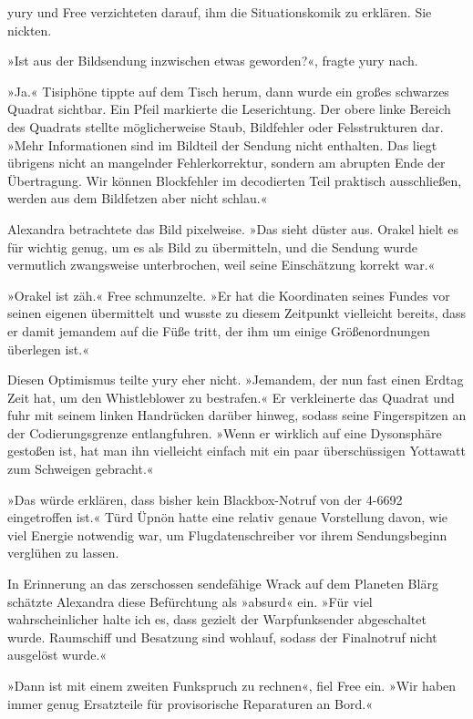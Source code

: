 yury und Free verzichteten darauf, ihm die Situationskomik zu erklären. Sie nickten.

»Ist aus der Bildsendung inzwischen etwas geworden?«, fragte yury nach.

»Ja.« Tisiphöne tippte auf dem Tisch herum, dann wurde ein großes schwarzes Quadrat sichtbar. Ein Pfeil markierte die Leserichtung. Der obere linke Bereich des Quadrats stellte möglicherweise Staub, Bildfehler oder Felsstrukturen dar. »Mehr Informationen sind im Bildteil der Sendung nicht enthalten. Das liegt übrigens nicht an mangelnder Fehlerkorrektur, sondern am abrupten Ende der Übertragung. Wir können Blockfehler im decodierten Teil praktisch ausschließen, werden aus dem Bildfetzen aber nicht schlau.«

Alexandra betrachtete das Bild pixelweise. »Das sieht düster aus. Orakel hielt es für wichtig genug, um es als Bild zu übermitteln, und die Sendung wurde vermutlich zwangsweise unterbrochen, weil seine Einschätzung korrekt war.«

»Orakel ist zäh.« Free schmunzelte. »Er hat die Koordinaten seines Fundes vor seinen eigenen übermittelt und wusste zu diesem Zeitpunkt vielleicht bereits, dass er damit jemandem auf die Füße tritt, der ihm um einige Größenordnungen überlegen ist.«

Diesen Optimismus teilte yury eher nicht. »Jemandem, der nun fast einen Erdtag Zeit hat, um den Whistleblower zu bestrafen.« Er verkleinerte das Quadrat und fuhr mit seinem linken Handrücken darüber hinweg, sodass seine Fingerspitzen an der Codierungsgrenze entlangfuhren. »Wenn er wirklich auf eine Dysonsphäre gestoßen ist, hat man ihn vielleicht einfach mit ein paar überschüssigen Yottawatt zum Schweigen gebracht.«

»Das würde erklären, dass bisher kein Blackbox-Notruf von der 4-6692 eingetroffen ist.« Türd Üpnön hatte eine relativ genaue Vorstellung davon, wie viel Energie notwendig war, um Flugdatenschreiber vor ihrem Sendungsbeginn verglühen zu lassen.

In Erinnerung an das zerschossen sendefähige Wrack auf dem Planeten Blärg schätzte Alexandra diese Befürchtung als »absurd« ein. »Für viel wahrscheinlicher halte ich es, dass gezielt der Warpfunksender abgeschaltet wurde. Raumschiff und Besatzung sind wohlauf, sodass der Finalnotruf nicht ausgelöst wurde.«

»Dann ist mit einem zweiten Funkspruch zu rechnen«, fiel Free ein. »Wir haben immer genug Ersatzteile für provisorische Reparaturen an Bord.«

